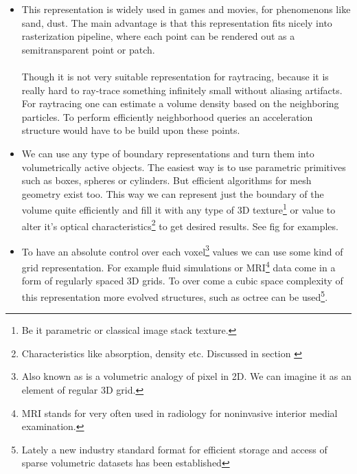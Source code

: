 \begin{itemize}
\item {}
This representation is widely used in games and movies, for phenomenons like sand, dust. The main advantage is that this representation fits nicely into rasterization pipeline, where each point can be rendered out as a semitransparent point or patch. 
\\
\\
Though it is not very suitable representation for raytracing, because it is really hard to ray-trace something infinitely small without aliasing artifacts. For raytracing one can estimate a volume density based on the neighboring particles. To perform efficiently neighborhood queries an acceleration structure would have to be build upon these points.

\item {}
We can use any type of boundary representations and turn them into volumetrically active objects. The easiest way is to use parametric primitives such as boxes, spheres or cylinders. But efficient algorithms for mesh geometry exist too. This way we can represent just the boundary of the volume quite efficiently and fill it with any type of 3D texture\footnote{Be it parametric or classical image stack texture.} or value to alter it's optical characteristics\footnote{Characteristics like absorption, density etc. Discussed in section \cite{sec::VOLINTER}} to get desired results. See fig \cite{fig:BOUND} for examples.


\item {}
To have an absolute control over each voxel\footnote{Also known as  is a volumetric analogy of pixel in 2D. We can imagine it as an element of regular 3D grid.} values we can use some kind of grid representation. For example fluid simulations or MRI\footnote{MRI stands for  very often used in radiology for noninvasive interior medial examination. } data come in a form of regularly spaced 3D grids. To over come a cubic space complexity of this representation more evolved structures, such as octree can be used\footnote{Lately a new industry standard format \cite{OPENVDB} for efficient storage and access of sparse volumetric datasets has been established}.


\end{itemize}
